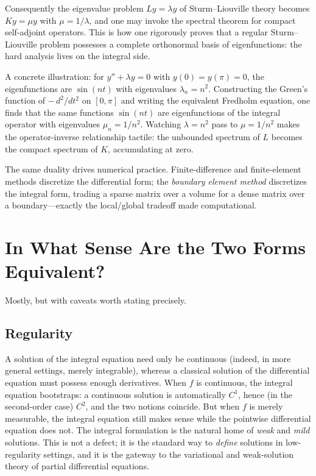 \documentclass{essay}
\begin{document}
Consequently the eigenvalue problem \(Ly = \lambda y\) of Sturm--Liouville theory becomes \(Ky = \mu y\) with \(\mu = 1/\lambda\), and one may invoke the spectral theorem for compact self-adjoint operators. This is how one rigorously proves that a regular Sturm--Liouville problem possesses a complete orthonormal basis of eigenfunctions: the hard analysis lives on the integral side.

A concrete illustration: for \(y'' + \lambda y = 0\) with \(y(0) = y(\pi) = 0\), the eigenfunctions are \(\sin(nt)\) with eigenvalues \(\lambda_{n} = n^{2}\). Constructing the Green's function of \(-\,d^{2}/dt^{2}\) on \([0, \pi]\) and writing the equivalent Fredholm equation, one finds that the same functions \(\sin(nt)\) are eigenfunctions of the integral operator with eigenvalues \(\mu_{n} = 1/n^{2}\). Watching \(\lambda = n^{2}\) pass to \(\mu = 1/n^{2}\) makes the operator-inverse relationship tactile: the unbounded spectrum of \(L\) becomes the compact spectrum of \(K\), accumulating at zero.

The same duality drives numerical practice. Finite-difference and finite-element methods discretize the differential form; the \emph{boundary element method} discretizes the integral form, trading a sparse matrix over a volume for a dense matrix over a boundary---exactly the local/global tradeoff made computational.

\section{In What Sense Are the Two Forms Equivalent?}
\label{sec:equivalence}

Mostly, but with caveats worth stating precisely.

\subsection{Regularity}

A solution of the integral equation need only be continuous (indeed, in more general settings, merely integrable), whereas a classical solution of the differential equation must possess enough derivatives. When \(f\) is continuous, the integral equation bootstraps: a continuous solution is automatically \(C^{1}\), hence (in the second-order case) \(C^{2}\), and the two notions coincide. But when \(f\) is merely measurable, the integral equation still makes sense while the pointwise differential equation does not. The integral formulation is the natural home of \emph{weak} and \emph{mild} solutions. This is not a defect; it is the standard way to \emph{define} solutions in low-regularity settings, and it is the gateway to the variational and weak-solution theory of partial differential equations.
\end{document}
